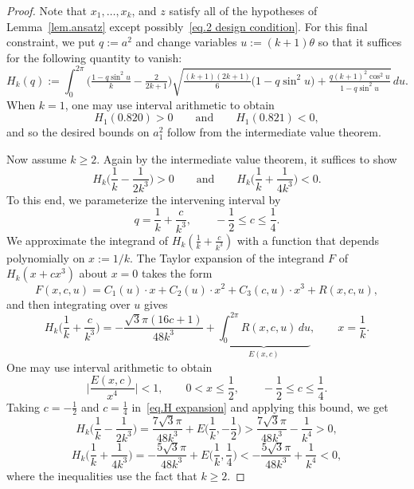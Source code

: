\documentclass[10pt,a4paper]{amsart}
\begin{document}
\begin{proof}
Note that $x_1,\ldots,x_k$, and $z$ satisfy all of the hypotheses of Lemma~\ref{lem.ansatz} except possibly~\eqref{eq.2 design condition}.
For this final constraint, we put $q:=a^2$ and change variables $u:=(k+1)\theta$ so that it suffices for the following quantity to vanish:
\[
H_k(q)
:=
\int_0^{2\pi}
\big(
\tfrac{1-q\sin^2u}{k}
-\tfrac{2}{2k+1}
\big)
\sqrt{
\tfrac{(k+1)(2k+1)}{6}\big(1-q\sin^2u\big)
+\tfrac{q(k+1)^2\cos^2u}{1-q\sin^2u}
}\,du.
\]
When $k=1$, one may use interval arithmetic to obtain
\[
H_1(0.820)>0
\qquad\text{and}\qquad
H_1(0.821)<0,
\]
and so the desired bounds on $a_1^2$ follow from the intermediate value theorem.

Now assume $k\geq 2$.
Again by the intermediate value theorem, it suffices to show
\[
H_k\bigg(\frac{1}{k}-\frac{1}{2k^3}\bigg)>0
\qquad\text{and}\qquad
H_k\bigg(\frac{1}{k}+\frac{1}{4k^3}\bigg)<0.
\]
To this end, we parameterize the intervening interval by
\[
q=\frac{1}{k}+\frac{c}{k^3},
\qquad
-\frac{1}{2}\leq c\leq \frac{1}{4}.
\]
We approximate the integrand of $H_k(\frac{1}{k}+\frac{c}{k^3})$ with a function that depends polynomially on $x:=1/k$.
The Taylor expansion of the integrand $F$ of $H_k(x+cx^3)$ about $x=0$ takes the form
\[
F(x,c,u)
=
C_1(u)\cdot x+C_2(u)\cdot x^2+C_3(c,u)\cdot x^3+R(x,c,u),
\]
and then integrating over $u$ gives
\begin{equation}
\label{eq.H expansion}
H_k\bigg(\frac1k+\frac{c}{k^3}\bigg)
=
-\frac{\sqrt3\pi(16c+1)}{48k^3}
+\underbrace{\int_0^{2\pi}
R(x,c,u)
\,du
}_{E(x,c)},
\qquad
x=\frac{1}{k}.
\end{equation}
One may use interval arithmetic to obtain
\[
\bigg|\frac{E(x,c)}{x^4}\bigg|
<1,
\qquad
0<x\leq\frac{1}{2},
\qquad
-\frac{1}{2}\leq c\leq\frac{1}{4}.
\]
Taking $c=-\frac{1}{2}$ and $c=\frac{1}{4}$ in~\eqref{eq.H expansion} and applying this bound, we get
\[
H_k\bigg(\frac{1}{k}-\frac{1}{2k^3}\bigg)
=\frac{7\sqrt{3}\pi}{48k^3}
+E\bigg(\frac{1}{k},-\frac{1}{2}\bigg)
>\frac{7\sqrt{3}\pi}{48k^3}
-\frac{1}{k^4}
>0,
\]
\[
H_k\bigg(\frac{1}{k}+\frac{1}{4k^3}\bigg)
=-\frac{5\sqrt{3}\pi}{48k^3}
+E\bigg(\frac{1}{k},\frac{1}{4}\bigg)
<-\frac{5\sqrt{3}\pi}{48k^3}+\frac{1}{k^4}
<0,
\]
where the inequalities use the fact that $k\geq 2$.
\end{proof}
\end{document}
